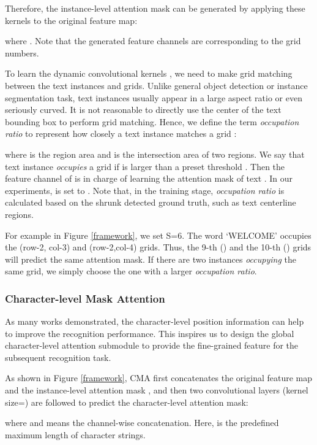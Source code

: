 \documentclass[letterpaper]{article} \usepackage{aaai21}  \usepackage{times}  \usepackage{helvet} \usepackage{courier}  \usepackage[hyphens]{url}  \usepackage{graphicx} \urlstyle{rm} \def\UrlFont{\rm}  \usepackage{natbib}  \usepackage{caption} \frenchspacing  \setlength{\pdfpagewidth}{8.5in}  \setlength{\pdfpageheight}{11in}  \usepackage{multirow}
\begin{document}
Therefore, the instance-level attention mask can be generated by applying these kernels to the original feature map:

where .
Note that the generated feature channels are corresponding to the grid numbers.

To learn the dynamic convolutional kernels , we need to make grid matching between the text instances and grids.
Unlike general object detection or instance segmentation task, text instances usually appear in a large aspect ratio or even seriously curved.
It is not reasonable to directly use the center of the text bounding box to perform grid matching.
Hence, we define the term \emph{occupation ratio}  to represent how closely a text instance  matches a grid :

where  is the region area and  is the intersection area of two regions.
We say that text instance  \emph{occupies} a grid  if  is larger than a preset threshold .
Then the feature channel  of  is in charge of learning the attention mask of text .
In our experiments,  is set to .
Note that, in the training stage, \emph{occupation ratio} is calculated based on the shrunk detected ground truth, such as text centerline regions.

For example in Figure \ref{framework}, we set S=6. The word `WELCOME' occupies the (row-2, col-3) and (row-2,col-4) grids. Thus, the 9-th () and the 10-th () grids will predict the same attention mask.
If there are two instances \emph{occupying} the same grid, we simply choose the one with a larger \emph{occupation ratio}.

\subsubsection{Character-level Mask Attention}
As many works \cite{cheng2017focus,xing2019convolutional} demonstrated, the character-level position information can help to improve the recognition performance.
This inspires us to design the global character-level attention submodule to provide the fine-grained feature for the subsequent recognition task.

As shown in Figure \ref{framework}, CMA first concatenates the original feature map  and the instance-level attention mask , and then two convolutional layers (kernel size=) are followed to predict the character-level attention mask:

where  and  means the channel-wise concatenation.
Here,  is the predefined maximum length of character strings.
\end{document}
